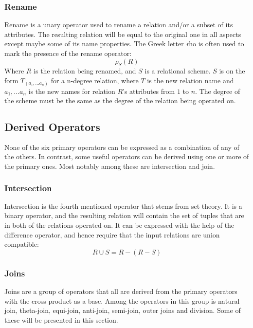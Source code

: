 \subsubsection{Rename}
Rename is a unary operator used to rename a relation and/or a subset of its attributes. The resulting relation will be equal to the original one in all aspects except maybe some of its name properties. The Greek letter \emph{r}ho is often used to mark the presence of the rename operator:
\begin{equation*}
\rho _{S}(R)
\end{equation*}
Where $R$ is the relation being renamed, and $S$ is a relational scheme. $S$ is on the form $T _{(a _{1},...a _{n})}$ for a n-degree relation, where $T$ is the new relation name and $a _{1},...a _{n}$ is the new names for relation $R$'s attributes from $1$ to $n$. The degree of the scheme must be the same as the degree of the relation being operated on.
\subsection{Derived Operators}
None of the six primary operators can be expressed as a combination of any of the others. In contrast, some useful operators can be derived using one or more of the primary ones. Most notably among these are intersection and join.
\subsubsection{Intersection}
Intersection is the fourth mentioned operator that stems from set theory. It is a binary operator, and the resulting relation will contain the set of tuples that are in both of the relations operated on. It can be expressed with the help of the difference operator, and hence require that the input relations are union compatible:
\begin{equation*}
R \cup S = R-(R-S)
\end{equation*}
\subsubsection{Joins}
Joins are a group of operators that all are derived from the primary operators with the cross product as a base. Among the operators in this group is natural join, theta-join, equi-join, anti-join, semi-join, outer joins and division. Some of these will be presented in this section.

